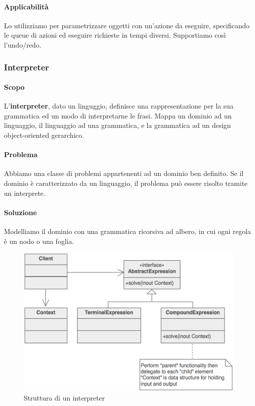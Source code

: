 \documentclass[11pt]{article}
\begin{document}
\paragraph{Applicabilità}
Lo utilizziamo per parametrizzare oggetti con un'azione da eseguire, specificando le queue di azioni ed eseguire richieste in tempi diversi. Supportiamo così l'undo/redo.
\subsubsection{Interpreter}
\paragraph{Scopo}
L'\textbf{interpreter}, dato un linguggio, definisce una rappresentazione per la sua grammatica ed un modo di interpretarne le frasi. Mappa un dominio ad un linguaggio, il linguaggio ad una grammatica, e la grammatica ad un design object-oriented gerarchico.
\paragraph{Problema}
Abbiamo una classe di problemi appartenenti ad un dominio ben definito. Se il dominio è caratterizzato da un linguaggio, il problema può essere risolto tramite un interprete. 
\paragraph{Soluzione}
Modelliamo il dominio con una grammatica ricorsiva ad albero, in cui ogni regola è un nodo o una foglia. 
\begin{figure}[H]
    \includegraphics[width=\linewidth]{res/teoria/Interpreter.png}
    \caption{Struttura di un interpreter}
\end{figure}
\end{document}
